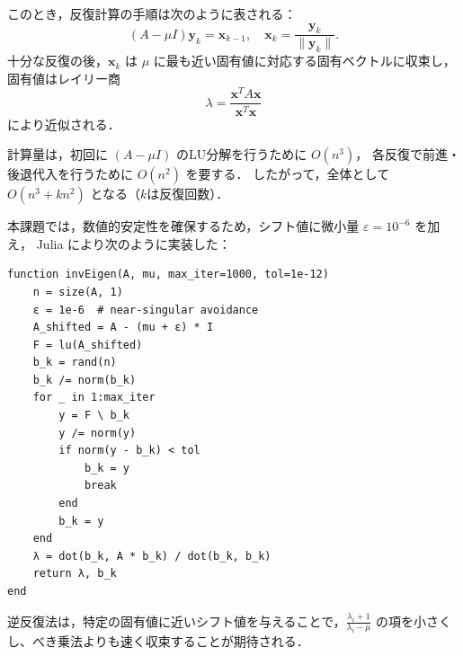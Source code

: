 \documentclass[a4paper,11pt]{ltjsarticle}
\begin{document}
このとき，反復計算の手順は次のように表される：
\[
(A - \mu I) \boldsymbol{y}_{k} = \boldsymbol{x}_{k-1}, \quad
\boldsymbol{x}_{k} = \frac{\boldsymbol{y}_{k}}{\|\boldsymbol{y}_{k}\|}.
\]
十分な反復の後，$\boldsymbol{x}_k$ は $\mu$ に最も近い固有値に対応する固有ベクトルに収束し，
固有値はレイリー商
\[
\lambda = \frac{\boldsymbol{x}^T A \boldsymbol{x}}{\boldsymbol{x}^T \boldsymbol{x}}
\]
により近似される．

計算量は，初回に $(A - \mu I)$ のLU分解を行うために $O(n^3)$，
各反復で前進・後退代入を行うために $O(n^2)$ を要する．
したがって，全体として $O(n^3 + k n^2)$ となる（$k$は反復回数）．

本課題では，数値的安定性を確保するため，シフト値に微小量 $\varepsilon=10^{-6}$ を加え，
Julia により次のように実装した：

\begin{verbatim}
function invEigen(A, mu, max_iter=1000, tol=1e-12)
    n = size(A, 1)
    ε = 1e-6  # near-singular avoidance
    A_shifted = A - (mu + ε) * I
    F = lu(A_shifted)
    b_k = rand(n)
    b_k /= norm(b_k)
    for _ in 1:max_iter
        y = F \ b_k
        y /= norm(y)
        if norm(y - b_k) < tol
            b_k = y
            break
        end
        b_k = y
    end
    λ = dot(b_k, A * b_k) / dot(b_k, b_k)
    return λ, b_k
end
\end{verbatim}



逆反復法は，特定の固有値に近いシフト値を与えることで，$\frac{\lambda_i+1}{\lambda_i - \mu}$ の項を小さくし、べき乗法よりも速く収束することが期待される．
\end{document}
